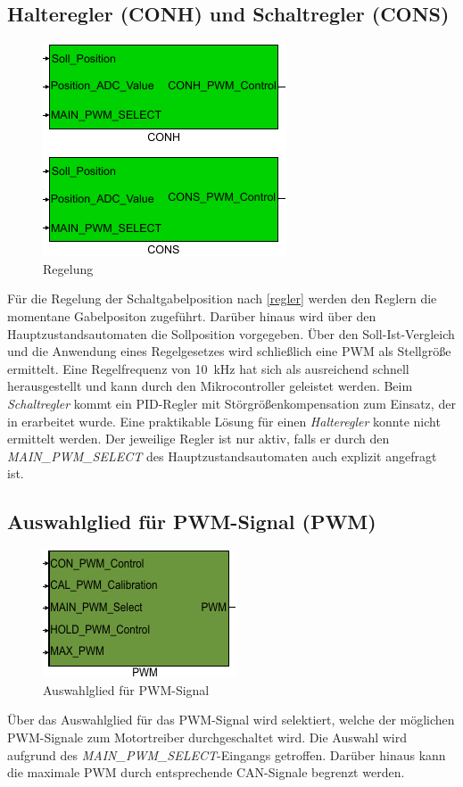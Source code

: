 \subsection{Halteregler (CONH) und Schaltregler (CONS)}

\begin{figure}[H]%
\centering
\includegraphics[width=0.2\columnwidth]{./Bilder/fig_conh_cons}%
\caption{Regelung}%
\label{fig_conh_cons}%
\end{figure}

Für die Regelung der Schaltgabelposition nach \autoref{regler} werden den Reglern die momentane Gabelpositon zugeführt. Darüber hinaus wird über den Hauptzustandsautomaten die Sollposition vorgegeben. Über den Soll-Ist-Vergleich und die Anwendung eines Regelgesetzes wird schließlich eine PWM als Stellgröße ermittelt. Eine Regelfrequenz von \SI{10}{kHz} hat sich als ausreichend schnell herausgestellt und kann durch den Mikrocontroller geleistet werden. Beim \textit{Schaltregler} kommt ein PID-Regler mit Störgrößenkompensation zum Einsatz, der in \cite{VorgaengerADP} erarbeitet wurde. Eine praktikable Lösung für einen \textit{Halteregler} konnte nicht ermittelt werden. Der jeweilige Regler ist nur aktiv, falls er durch den \textit{MAIN\_PWM\_SELECT} des Hauptzustandsautomaten auch explizit angefragt ist.
 
\subsection{Auswahlglied für PWM-Signal (PWM)}

\begin{figure}[H]%
\centering
\includegraphics[width=0.2\columnwidth]{./Bilder/fig_pwm}%
\caption{Auswahlglied für PWM-Signal}%
\label{fig_pwm}%
\end{figure}

Über das Auswahlglied für das PWM-Signal wird selektiert, welche der möglichen PWM-Signale zum Motortreiber durchgeschaltet wird. Die Auswahl wird aufgrund des \textit{MAIN\_PWM\_SELECT}-Eingangs getroffen. Darüber hinaus kann die maximale PWM durch entsprechende CAN-Signale begrenzt werden. 

